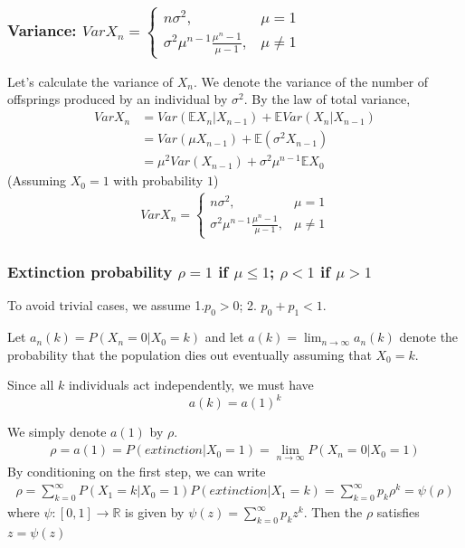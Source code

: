 \documentclass[11pt,a4paper]{article}
\begin{document}
\subsubsection{Variance: $Var X_n=\left\{\begin{matrix}
    n\sigma^2,&\mu=1\\
    \sigma^2\mu^{n-1}\frac{\mu^n-1}{\mu-1},&\mu\neq 1
\end{matrix}\right.$}
Let's calculate the variance of $X_n$. We denote the variance of the number of offsprings produced by an individual by $\sigma^2$. By the law of total variance,
\begin{equation}
    \begin{aligned}
        Var X_n&=Var(\mathbb{E} X_n|X_{n-1})+\mathbb{E}Var(X_n|X_{n-1})\\&=Var(\mu X_{n-1})+ \mathbb{E}(\sigma^2 X_{n-1})\\&=\mu^2 Var(X_{n-1})+\sigma^2 \mu^{n-1}\mathbb{E}X_0
    \end{aligned}
    \nonumber
\end{equation}
(Assuming $X_0=1$ with probability $1$)
\begin{equation}
    \begin{aligned}
        Var X_n=\left\{\begin{matrix}
            n\sigma^2,&\mu=1\\
            \sigma^2\mu^{n-1}\frac{\mu^n-1}{\mu-1},&\mu\neq 1
        \end{matrix}\right.
    \end{aligned}
    \nonumber
\end{equation}



\subsubsection{Extinction probability $\rho=1$ if $\mu\leq 1$; $\rho<1$ if $\mu>1$}

To avoid trivial cases, we assume 1.$p_0>0$; 2. $p_0+p_1<1$.

Let $a_n(k)=P(X_n=0|X_0=k)$ and let $a(k)=\lim_{n \rightarrow \infty}a_n(k)$ denote the probability that the population dies out eventually assuming that $X_0=k$.

Since all $k$ individuals act independently, we must have $$a(k)=a(1)^k$$

We simply denote $a(1)$ by $\rho$.
\begin{equation}
    \begin{aligned}
        \rho=a(1)=P(extinction|X_0=1)=\lim_{n \rightarrow \infty}P(X_n=0|X_0=1)
    \end{aligned}
    \nonumber
\end{equation}
By conditioning on the first step, we can write
\begin{equation}
    \begin{aligned}
        \rho=\sum_{k=0}^\infty P(X_1=k|X_0=1)P(extinction|X_1=k)=\sum_{k=0}^\infty p_k\rho^k=\psi(\rho)
    \end{aligned}
    \nonumber
\end{equation}
where $\psi:[0,1] \rightarrow \mathbb{R}$ is given by $\psi(z)=\sum_{k=0}^\infty p_k z^k$. Then the $\rho$ satisfies $z=\psi(z)$
\end{document}
